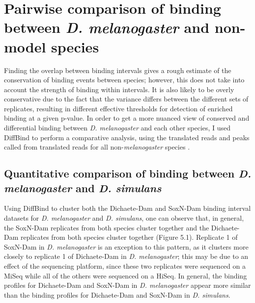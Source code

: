 \section{Pairwise comparison of binding between \emph{D. melanogaster} and non-model species}

Finding the overlap between binding intervals gives a rough estimate of the conservation of binding events between species; however, this does not take into account the strength of binding within intervals. It is also likely to be overly conservative due to the fact that the variance differs between the different sets of replicates, resulting in different effective thresholds for detection of enriched binding at a given p-value. In order to get a more nuanced view of conserved and differential binding between \emph{D. melanogaster} and each other species, I used DiffBind to perform a comparative analysis, using the translated reads and peaks called from translated reads for all non-\emph{melanogaster} species \citep{ross-innes_differential_2012-1}.

\subsection{Quantitative comparison of binding between \emph{D. melanogaster} and \emph{D. simulans}}

Using DiffBind to cluster both the Dichaete-Dam and SoxN-Dam binding interval datasets for \emph{D. melanogaster} and \emph{D. simulans}, one can observe that, in general, the SoxN-Dam replicates from both species cluster together and the Dichaete-Dam replicates from both species cluster together (Figure 5.1). Replicate 1 of SoxN-Dam in \emph{D. melanogaster} is an exception to this pattern, as it clusters more closely to replicate 1 of Dichaete-Dam in \emph{D. melanogaster}; this may be due to an effect of the sequencing platform, since these two replicates were sequenced on a MiSeq while all of the others were sequenced on a HiSeq. In general, the binding profiles for Dichaete-Dam and SoxN-Dam in \emph{D. melanogaster} appear more similar than the binding profiles for Dichaete-Dam and SoxN-Dam in \emph{D. simulans}.\\

